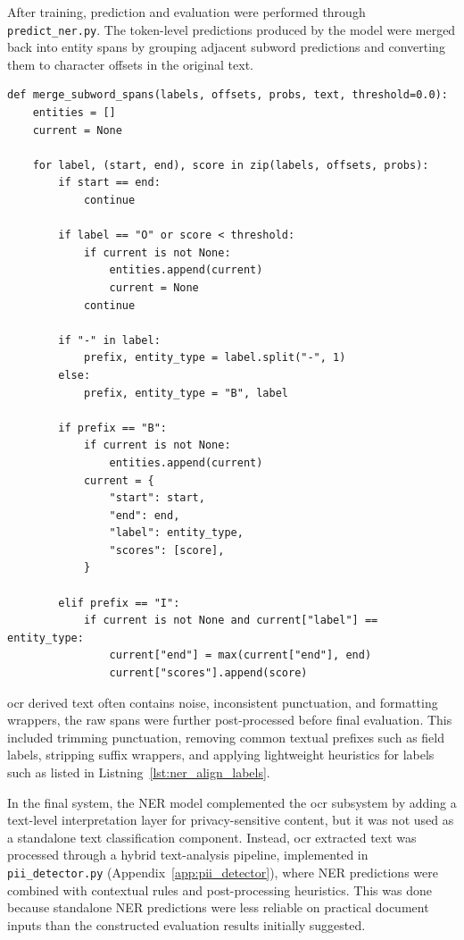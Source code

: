 
After training, prediction and evaluation were performed through \texttt{predict\_ner.py}. The token-level predictions produced by the model were merged back into entity spans by grouping adjacent subword predictions and converting them to character offsets in the original text.

\begin{lstlisting}[caption={Merging token predictions into entity spans}, label={lst:ner_merge_spans}]
def merge_subword_spans(labels, offsets, probs, text, threshold=0.0):
    entities = []
    current = None

    for label, (start, end), score in zip(labels, offsets, probs):
        if start == end:
            continue

        if label == "O" or score < threshold:
            if current is not None:
                entities.append(current)
                current = None
            continue

        if "-" in label:
            prefix, entity_type = label.split("-", 1)
        else:
            prefix, entity_type = "B", label

        if prefix == "B":
            if current is not None:
                entities.append(current)
            current = {
                "start": start,
                "end": end,
                "label": entity_type,
                "scores": [score],
            }

        elif prefix == "I":
            if current is not None and current["label"] == entity_type:
                current["end"] = max(current["end"], end)
                current["scores"].append(score)
\end{lstlisting}

\acrshort{ocr} derived text often contains noise, inconsistent punctuation, and formatting wrappers, the raw spans were further post-processed before final evaluation. This included trimming punctuation, removing common textual prefixes such as field labels, stripping suffix wrappers, and applying lightweight heuristics for labels such as listed in Listning~\ref{lst:ner_align_labels}.

In the final system, the NER model complemented the \acrshort{ocr} subsystem by adding a text-level interpretation layer for privacy-sensitive content, but it was not used as a standalone text classification component. Instead, \acrshort{ocr} extracted text was processed through a hybrid text-analysis pipeline, implemented in
\texttt{pii\_detector.py} (Appendix~\ref{app:pii_detector}), where NER predictions were combined with contextual rules and post-processing heuristics. This was done because standalone NER predictions were less reliable on practical document inputs than the constructed evaluation results initially
suggested.

